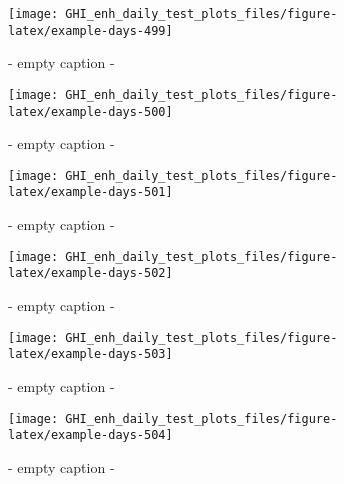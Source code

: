 \documentclass[
  10pt,
  a4paper,oneside]{article}
\begin{document}
\begin{figure}[H]

{\centering \texttt{[image: GHI\_enh\_daily\_test\_plots\_files/figure-latex/example-days-499]} 

}

\caption{ - empty caption - }\label{fig:example-days-499}
\end{figure}

\begin{figure}[H]

{\centering \texttt{[image: GHI\_enh\_daily\_test\_plots\_files/figure-latex/example-days-500]} 

}

\caption{ - empty caption - }\label{fig:example-days-500}
\end{figure}

\begin{figure}[H]

{\centering \texttt{[image: GHI\_enh\_daily\_test\_plots\_files/figure-latex/example-days-501]} 

}

\caption{ - empty caption - }\label{fig:example-days-501}
\end{figure}

\begin{figure}[H]

{\centering \texttt{[image: GHI\_enh\_daily\_test\_plots\_files/figure-latex/example-days-502]} 

}

\caption{ - empty caption - }\label{fig:example-days-502}
\end{figure}

\begin{figure}[H]

{\centering \texttt{[image: GHI\_enh\_daily\_test\_plots\_files/figure-latex/example-days-503]} 

}

\caption{ - empty caption - }\label{fig:example-days-503}
\end{figure}

\begin{figure}[H]

{\centering \texttt{[image: GHI\_enh\_daily\_test\_plots\_files/figure-latex/example-days-504]} 

}

\caption{ - empty caption - }\label{fig:example-days-504}
\end{figure}
\end{document}
